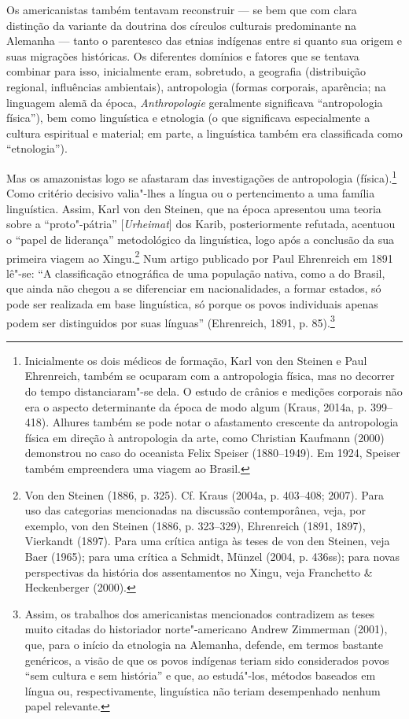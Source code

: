 Os americanistas também tentavam reconstruir --- se bem que com clara
distinção da variante da doutrina dos círculos culturais predominante na
Alemanha --- tanto o parentesco das etnias indígenas entre si quanto sua
origem e suas migrações históricas. Os diferentes domínios e fatores que
se tentava combinar para isso, inicialmente eram, sobretudo, a
geografia (distribuição regional, influências ambientais), antropologia
(formas corporais, aparência; na linguagem alemã da época,
\emph{Anthropologie} geralmente significava ``antropologia física''),
bem como linguística e etnologia (o que significava especialmente a
cultura espiritual e material; em parte, a linguística também era
classificada como ``etnologia'').

Mas os amazonistas logo se afastaram das investigações de antropologia
(física).\footnote{Inicialmente os dois médicos de formação, Karl von
  den Steinen e Paul Ehrenreich, também se ocuparam com a antropologia
  física, mas no decorrer do tempo distanciaram"-se dela. O estudo de
  crânios e medições corporais não era o aspecto determinante da época
  de modo algum (Kraus, 2014a, p. 399--418). Alhures também se pode notar
  o afastamento crescente da antropologia física em direção à
  antropologia da arte, como Christian Kaufmann (2000) demonstrou no
  caso do oceanista Felix Speiser (1880--1949). Em 1924, Speiser também
  empreendera uma viagem ao Brasil.} Como critério decisivo valia"-lhes a
língua ou o pertencimento a uma família linguística. Assim, Karl von den
Steinen, que na época apresentou uma teoria sobre a ``proto"-pátria''
{[}\emph{Urheimat}{]} dos Karib, posteriormente refutada, acentuou o
``papel de liderança'' metodológico da linguística, logo após a
conclusão da sua primeira viagem ao Xingu.\footnote{Von den Steinen
  (1886, p. 325). Cf. Kraus (2004a, p. 403--408; 2007). Para uso das
  categorias mencionadas na discussão contemporânea, veja, por exemplo,
  von den Steinen (1886, p. 323--329), Ehrenreich (1891, 1897), Vierkandt
  (1897). Para uma crítica antiga às teses de von den Steinen, veja Baer
  (1965); para uma crítica a Schmidt, Münzel (2004, p. 436ss); para
  novas perspectivas da história dos assentamentos no Xingu, veja
  Franchetto \& Heckenberger (2000).} Num artigo publicado por Paul
Ehrenreich em 1891 lê"-se: ``A classificação etnográfica de uma população
nativa, como a do Brasil, que ainda não chegou a se diferenciar em
nacionalidades, a formar estados, só pode ser realizada em base
linguística, só porque os povos individuais apenas podem ser
distinguidos por suas línguas'' (Ehrenreich, 1891, p. 85).\footnote{Assim,
  os trabalhos dos americanistas mencionados contradizem as teses muito
  citadas do historiador norte"-americano Andrew Zimmerman (2001), que,
  para o início da etnologia na Alemanha, defende, em termos bastante
  genéricos, a visão de que os povos indígenas teriam sido considerados
  povos ``sem cultura e sem história'' e que, ao estudá"-los, métodos
  baseados em língua ou, respectivamente, linguística não teriam
  desempenhado nenhum papel relevante.}

